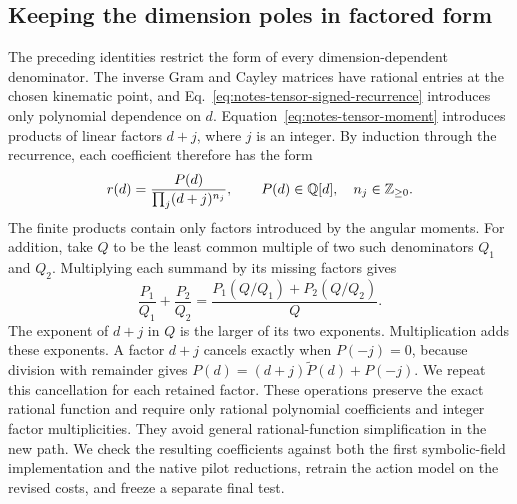 \subsection{Keeping the dimension poles in factored form}
The preceding identities restrict the form of every dimension-dependent denominator. The inverse Gram and Cayley matrices have rational entries at the chosen kinematic point, and Eq.~\eqref{eq:notes-tensor-signed-recurrence} introduces only polynomial dependence on $d$. Equation~\eqref{eq:notes-tensor-moment} introduces products of linear factors $d+j$, where $j$ is an integer. By induction through the recurrence, each coefficient therefore has the form
\begin{equation}
 r(d)=\frac{P(d)}{\prod_j(d+j)^{n_j}},\qquad
 P(d)\in\mathbb Q[d],\quad n_j\in\mathbb Z_{\geq0}.
 \label{eq:notes-tensor-factored-field}
\end{equation}
The finite products contain only factors introduced by the angular moments. For addition, take $Q$ to be the least common multiple of two such denominators $Q_1$ and $Q_2$. Multiplying each summand by its missing factors gives
\begin{equation}
 \frac{P_1}{Q_1}+\frac{P_2}{Q_2}
 =\frac{P_1(Q/Q_1)+P_2(Q/Q_2)}{Q}.
 \label{eq:notes-tensor-factored-add}
\end{equation}
The exponent of $d+j$ in $Q$ is the larger of its two exponents. Multiplication adds these exponents. A factor $d+j$ cancels exactly when $P(-j)=0$, because division with remainder gives $P(d)=(d+j)\widetilde P(d)+P(-j)$. We repeat this cancellation for each retained factor. These operations preserve the exact rational function and require only rational polynomial coefficients and integer factor multiplicities. They avoid general rational-function simplification in the new path. We check the resulting coefficients against both the first symbolic-field implementation and the native pilot reductions, retrain the action model on the revised costs, and freeze a separate final test.

